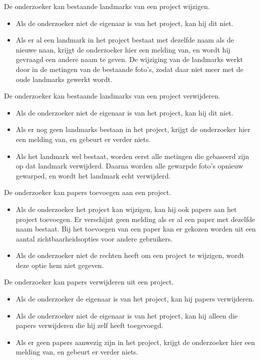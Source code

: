 De onderzoeker kan bestaande landmarks van een project wijzigen.
\begin{itemize}
	\item Als de onderzoeker niet de eigenaar is van het project, kan hij dit niet.
	\item Als er al een landmark in het project bestaat met dezelfde naam als de nieuwe naan, krijgt de onderzoeker hier een melding van, en wordt hij gevraagd een andere naam te geven. De wijziging van de landmarks werkt door in de metingen van de bestaande foto's, zodat daar niet meer met de oude landmarks gewerkt wordt.
\end{itemize}

De onderzoeker kan bestaande landmarks van een project verwijderen.
\begin{itemize}
	\item Als de onderzoeker niet de eigenaar is van het project, kan hij dit niet.
	\item Als er nog geen landmarks bestaan in het project, krijgt de onderzoeker hier een melding van, en gebeurt er verder niets.
	\item Als het landmark wel bestaat, worden eerst alle metingen die gebaseerd zijn op dat landmark verwijderd. Daarna worden alle gewarpde foto's opnieuw gewarped, en wordt het landmark echt verwijderd.
\end{itemize}

De onderzoeker kan papers toevoegen aan een project.
\begin{itemize}
	\item Als de onderzoeker het project kan wijzigen, kan hij ook papers aan het project toevoegen. Er verschijnt geen melding als er al een paper met dezelfde naam bestaat. Bij het toevoegen van een paper kan er gekozen worden uit een aantal zichtbaarheidsopties voor andere gebruikers.
	\item Als de onderzoeker niet de rechten heeft om een project te wijzigen, wordt deze optie hem niet gegeven.
\end{itemize}

De onderzoeker kan papers verwijderen uit een project.
\begin{itemize}
	\item Als de onderzoeker de eigenaar is van het project, kan hij papers verwijderen.
	\item Als de onderzoeker niet de eigenaar is van het project, kan hij alleen die papers verwijderen die hij zelf heeft toegevoegd.
	\item Als er geen papers aanwezig zijn in het project, krijgt de onderzoeker hier een melding van, en gebeurt er verder niets.
\end{itemize}

